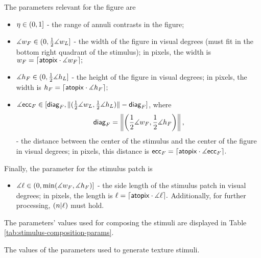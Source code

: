 The parameters relevant for the figure are
\begin{itemize}

    \item $\eta \in (0, 1]$ - the range of annuli contrasts in the figure;
    
    \item $\measuredangle w_F \in (0, \frac{1}{2} \measuredangle w_L]$ - the width of the figure in visual degrees (must fit in the bottom right quadrant of the stimulus); in pixels, the width is
    $
        {w_F} = \lceil\mathsf{atopix} \cdot \measuredangle w_F\rceil;
    $
    
    \item $\measuredangle h_F \in (0, \frac{1}{2} \measuredangle h_L]$ - the height of the figure in visual degrees; in pixels, the width is
    $
        {h_F} = \lceil\mathsf{atopix} \cdot \measuredangle h_F\rceil;
    $
    
    \item $\measuredangle \mathsf{ecc}_F \in [\mathsf{diag}_F, \| (\frac{1}{2} \measuredangle w_L, \frac{1}{2} \measuredangle h_L)\| - \mathsf{diag}_F]$, where
    \begin{equation*}
        \mathsf{diag}_F = \left\| 
            \left(
                \frac{1}{2} \measuredangle w_F, 
                \frac{1}{2} \measuredangle h_F 
            \right)
        \right\|,
    \end{equation*}
    - the distance between the center of the stimulus and the center of the figure in visual degrees; in pixels, this distance is
    $
        \mathsf{ecc}_F = \lceil\mathsf{atopix} \cdot \measuredangle \mathsf{ecc}_F\rceil.
    $
\end{itemize}

Finally, the parameter for the stimulus patch is
\begin{itemize}
    \item $\measuredangle \ell \in (0, \min(\measuredangle w_F, \measuredangle h_F)]$ - the side length of the stimulus patch in visual degrees; in pixels, the length is
    $
        \ell = \lceil\mathsf{atopix} \cdot \measuredangle \ell\rceil.
    $
    Additionally, for further processing, $(n | \ell)$ must hold.
\end{itemize}

The parameters' values used for composing the stimuli are displayed in Table \ref{tab:stimulus-composition-params}.

\begin{table}[!htp]
    \centering
    
    \caption{The values of the parameters used to generate texture stimuli.}
    \label{tab:stimulus-composition-params}
\end{table}